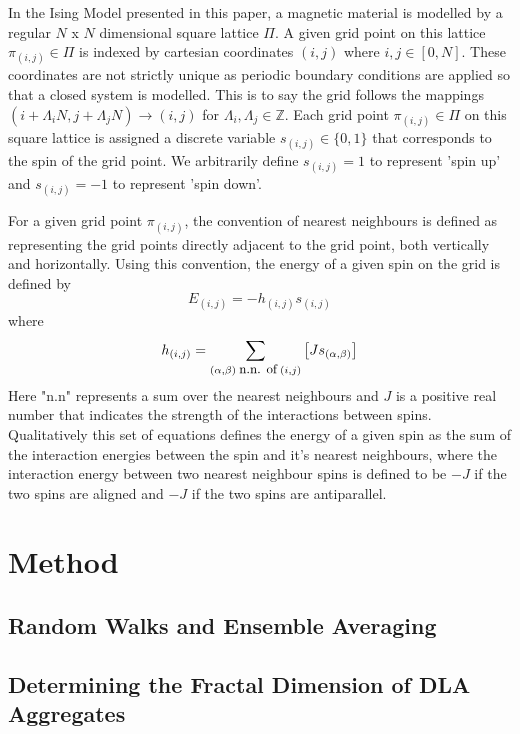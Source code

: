 \documentclass[11pt]{iopart}
\begin{document}
In the Ising Model presented in this paper, a magnetic material is modelled by a regular $N$ x $N$ dimensional square lattice $\Pi$. A given grid point on this lattice $\pi_{(i,j)} \in \Pi$ is indexed by cartesian coordinates $(i, j)$ where $i, j \in [0, N]$. These coordinates are not strictly unique as periodic boundary conditions are applied so that a closed system is modelled. This is to say the grid follows the mappings $(i + \Lambda_i N, j + \Lambda_j N) \to (i, j)$ for $\Lambda_i, \Lambda_j \in \mathbb{Z}$. Each grid point $\pi_{(i, j)} \in \Pi$ on this square lattice is assigned a discrete variable  $s_{(i, j)} \in \{0, 1\}$ that corresponds to the spin of the grid point. We arbitrarily define $s_{(i, j)} = 1$ to represent 'spin up' and $s_{(i,j)} = -1$ to represent 'spin down'.

For a given grid point $\pi_{(i, j)}$, the convention of nearest neighbours is defined as representing the grid points directly adjacent to the grid point, both vertically and horizontally. Using this convention, the energy of a given spin on the grid is defined by
\begin{equation}
E_{(i, j)} = -h_{(i, j)} s_{(i, j)}
\end{equation}
where
\begin{equation}
h_{(i, j)} = \sum_{(\alpha, \beta) \; \textrm{\small{n.n. of}} \; (i, j)} \left[ J  s_{(\alpha, \beta)} \right]
\end{equation}
Here "n.n" represents a sum over the nearest neighbours and $J$ is a positive real number that indicates the strength of the interactions between spins. Qualitatively this set of equations defines the energy of a given spin as the sum of the interaction energies between the spin and it's nearest neighbours, where the interaction energy between two nearest neighbour spins is defined to be $-J$ if the two spins are aligned and $-J$ if the two spins are antiparallel.

\section{Method}

\subsection{Random Walks and Ensemble Averaging}

\subsection{Determining the Fractal Dimension of DLA Aggregates}
\end{document}
